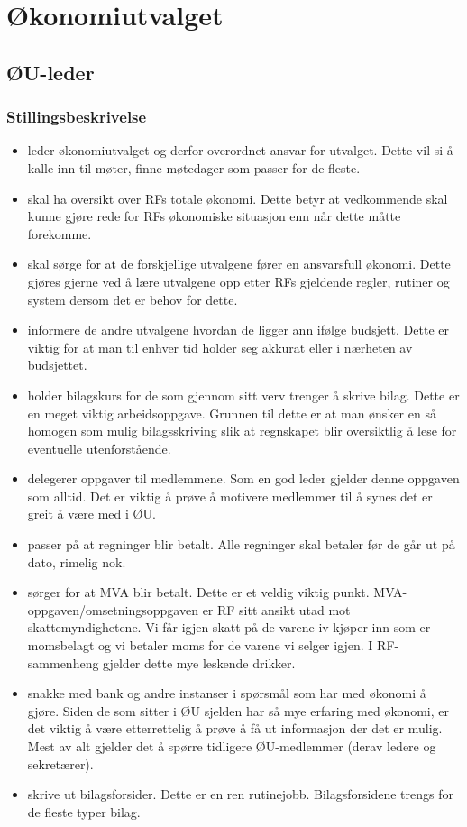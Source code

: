 \section{Økonomiutvalget}

\subsection{ØU-leder}

\subsubsection{Stillingsbeskrivelse}

\begin{itemize}
\item{} leder økonomiutvalget og derfor overordnet ansvar for
  utvalget. Dette vil si å kalle inn til møter, finne møtedager som
  passer for de fleste.
\item{} skal ha oversikt over RFs totale økonomi. Dette betyr at
  vedkommende skal kunne gjøre rede for RFs økonomiske situasjon enn
  når dette måtte forekomme.
\item{} skal sørge for at de forskjellige utvalgene fører en
  ansvarsfull økonomi. Dette gjøres gjerne ved å lære utvalgene opp
  etter RFs gjeldende regler, rutiner og system dersom det er behov
  for dette.
\item{} informere de andre utvalgene hvordan de ligger ann ifølge
  budsjett. Dette er viktig for at man til enhver tid holder seg
  akkurat eller i nærheten av budsjettet.
\item{} holder bilagskurs for de som gjennom sitt verv trenger å
  skrive bilag. Dette er en meget viktig arbeidsoppgave. Grunnen til
  dette er at man ønsker en så homogen som mulig bilagsskriving slik
  at regnskapet blir oversiktlig å lese for eventuelle utenforstående.
\item{} delegerer oppgaver til medlemmene. Som en god leder gjelder
  denne oppgaven som alltid. Det er viktig å prøve å motivere
  medlemmer til å synes det er greit å være med i ØU.
\item{} passer på at regninger blir betalt. Alle regninger skal
  betaler før de går ut på dato, rimelig nok.
\item{} sørger for at MVA blir betalt. Dette er et veldig viktig
  punkt. MVA-oppgaven/omsetningsoppgaven er RF sitt ansikt utad mot
  skattemyndighetene. Vi får igjen skatt på de varene iv kjøper inn som er
  momsbelagt og vi betaler moms for de varene vi selger igjen. I
  RF-sammenheng gjelder dette mye leskende drikker.
\item{} snakke med bank og andre instanser i spørsmål som har med
  økonomi å gjøre. Siden de som sitter i ØU sjelden har så mye
  erfaring med økonomi, er det viktig å være etterrettelig å prøve å
  få ut informasjon der det er mulig. Mest av alt gjelder det å spørre
  tidligere ØU-medlemmer (derav ledere og sekretærer). 
\item{} skrive ut bilagsforsider. Dette er en ren
  rutinejobb. Bilagsforsidene trengs for de fleste typer bilag.
\end{itemize}

